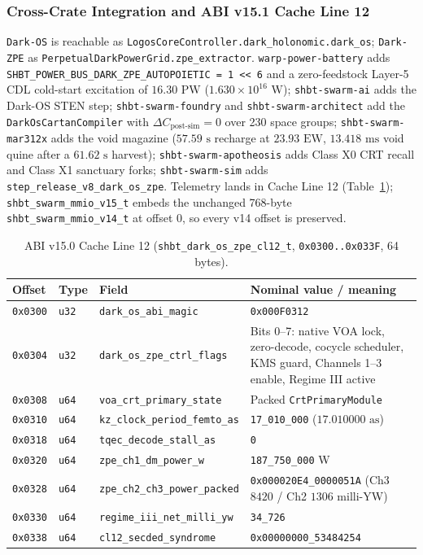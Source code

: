 \documentclass[11pt,onecolumn]{article}
\begin{document}
\subsubsection{Cross-Crate Integration and ABI v15.1 Cache Line 12}
\label{subsubsec:v8_cl12_integration}
\texttt{Dark-OS} is reachable as \texttt{LogosCoreController.dark\_holonomic.dark\_os}; \texttt{Dark-ZPE} as \texttt{PerpetualDarkPowerGrid.zpe\_extractor}. \texttt{warp-power-battery} adds \texttt{SHBT\_POWER\_BUS\_DARK\_ZPE\_AUTOPOIETIC = 1 << 6} and a zero-feedstock Layer-5 CDL cold-start excitation of $16.30\text{ PW}$ ($1.630\times10^{16}\text{ W}$); \texttt{shbt-swarm-ai} adds the Dark-OS STEN step; \texttt{shbt-swarm-foundry} and \texttt{shbt-swarm-architect} add the \texttt{DarkOsCartanCompiler} with $\Delta C_{\text{post-sim}}=0$ over 230 space groups; \texttt{shbt-swarm-mar312x} adds the void magazine ($57.59\text{ s}$ recharge at $23.93\text{ EW}$, $13.418\text{ ms}$ void quine after a $61.62\text{ s}$ harvest); \texttt{shbt-swarm-apotheosis} adds Class X0 CRT recall and Class X1 sanctuary forks; \texttt{shbt-swarm-sim} adds \texttt{step\_release\_v8\_dark\_os\_zpe}. Telemetry lands in Cache Line 12 (Table~\ref{tab:v8_cl12}); \texttt{shbt\_swarm\_mmio\_v15\_t} embeds the unchanged 768-byte \texttt{shbt\_swarm\_mmio\_v14\_t} at offset 0, so every v14 offset is preserved.

\begin{table}[!htbp]
\centering\small
\caption{ABI v15.0 Cache Line 12 (\texttt{shbt\_dark\_os\_zpe\_cl12\_t}, \texttt{0x0300..0x033F}, 64 bytes).}
\label{tab:v8_cl12}
\begin{tabularx}{\textwidth}{@{}l l l X@{}}
\toprule
Offset & Type & Field & Nominal value / meaning \\
\midrule
\texttt{0x0300} & \texttt{u32} & \texttt{dark\_os\_abi\_magic} & \texttt{0x000F0312} \\
\texttt{0x0304} & \texttt{u32} & \texttt{dark\_os\_zpe\_ctrl\_flags} & Bits 0--7: native VOA lock, zero-decode, cocycle scheduler, KMS guard, Channels 1--3 enable, Regime III active \\
\texttt{0x0308} & \texttt{u64} & \texttt{voa\_crt\_primary\_state} & Packed \texttt{CrtPrimaryModule} \\
\texttt{0x0310} & \texttt{u64} & \texttt{kz\_clock\_period\_femto\_as} & \texttt{17\_010\_000} ($17.010000\text{ as}$) \\
\texttt{0x0318} & \texttt{u64} & \texttt{tqec\_decode\_stall\_as} & \texttt{0} \\
\texttt{0x0320} & \texttt{u64} & \texttt{zpe\_ch1\_dm\_power\_w} & \texttt{187\_750\_000} W \\
\texttt{0x0328} & \texttt{u64} & \texttt{zpe\_ch2\_ch3\_power\_packed} & \texttt{0x000020E4\_0000051A} (Ch3 $8420$ / Ch2 $1306$ milli-YW) \\
\texttt{0x0330} & \texttt{u64} & \texttt{regime\_iii\_net\_milli\_yw} & \texttt{34\_726} \\
\texttt{0x0338} & \texttt{u64} & \texttt{cl12\_secded\_syndrome} & \texttt{0x00000000\_53484254} \\
\bottomrule
\end{tabularx}
\end{table}
\end{document}
